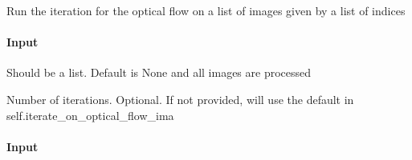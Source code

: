 \documentclass[letterpaper,10pt,english]{sphinxmanual}
\begin{document}
\begin{fulllineitems}
\begin{fulllineitems}
\label{\detokenize{api/pymusepipe:pymusepipe.align_pipe.AlignMuseDataset.iterate_on_optical_flow_listima}}
\pysigstartsignatures
{}
\pysigstopsignatures
\sphinxAtStartPar
Run the iteration for the optical flow on a list of images
given by a list of indices


\paragraph{Input}
\label{\detokenize{api/pymusepipe:id16}}\begin{description}
\sphinxAtStartPar
Should be a list. Default is None
and all images are processed

\sphinxAtStartPar
Number of iterations. Optional. If  not provided, will use the
default in self.iterate\_on\_optical\_flow\_ima

\end{description}

\end{fulllineitems}


\begin{fulllineitems}
\label{\detokenize{api/pymusepipe:pymusepipe.align_pipe.AlignMuseDataset.list_states}}
\pysigstartsignatures
{}
\pysigstopsignatures

\paragraph{Input}
\label{\detokenize{api/pymusepipe:id17}}
\end{fulllineitems}



\end{fulllineitems}
\end{document}
